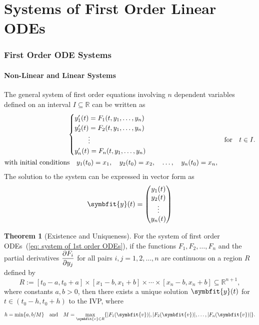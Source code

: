 \documentclass[10pt,UTF8]{article}
\renewcommand{\vec}[1]{%
  \ifnum0\ifcat#1a1\else0\fi>0
  \symbfit{#1}  %
  \else
  \symbf{#1}  %
  \fi
}
\newenvironment{theoremBox}
{ \bigskip
  \begin{tcolorbox}[colback=yellow!5!white,colframe=yellow!75!black,parbox=false,before
  upper=\par,before lower=\par]}
  {
\end{tcolorbox}}
\theoremstyle{definition}
\newtheorem{definition inner}{Definition}[section]
\theoremstyle{definition}
\newtheorem{theorem inner}{Theorem}[section]
\newenvironment{theorem}[1][]
{
  \begin{theoremBox}
  \begin{theorem inner}[#1]\hfill\par}
    {
    \end{theorem inner}
\end{theoremBox}}
\theoremstyle{definition}
\newtheorem*{proof inner}{\textit{Proof}}
\theoremstyle{plain}
\newtheorem{tip inner}{Tip}[section]
\theoremstyle{remark}
\begin{document}
\part*{Systems of First Order Linear ODEs}

\section{First Order ODE Systems}

\subsection{Non-Linear and Linear Systems}

The general system of first order equations involving
\(n\) dependent variables defined on an interval \(I \subseteq \mathbb{R}\)
can be written as
\begin{equation}
  \begin{gathered}
    \begin{cases}
      y_1'(t) = F_1(t, y_1, \ldots, y_n) \\
      y_2'(t) = F_2(t, y_1, \ldots, y_n) \\
      \qquad\vdots \\
      y_n'(t) = F_n(t, y_1, \ldots, y_n)
    \end{cases} \\
    \text{with initial conditions}\quad
    y_1(t_0) = x_1, \quad
    y_2(t_0) = x_2, \quad
    \ldots, \quad
    y_n(t_0) = x_n,
  \end{gathered}
  \qfor t\in I.
  \label{eq: system of 1st order ODEs}
\end{equation}
The solution to the system can be expressed in vector form as
\begin{equation*}
  \vec{y}(t) =
  \begin{pmatrix}
    y_1(t) \\
    y_2(t) \\
    \vdots \\
    y_n(t)
  \end{pmatrix}
\end{equation*}

\begin{theorem}[Existence and Uniqueness]
  {}\label{thm: Existence and Uniqueness for 1st order ODE Systems}
  For the system of first order ODEs~(\ref{eq: system of 1st order ODEs}),
  if the functions \(F_1, F_2, \ldots, F_n\) and the partial derivatives
  \(\displaystyle\pdv{F_i}{y_j}\) for all pairs \(i, j = 1, 2, \ldots, n\)
  are continuous on a region \(R\) defined by
  \begin{equation*}
    R := [t_0 - a, t_0 + a] \times [x_1 - b, x_1 + b] \times \cdots
    \times [x_n - b, x_n + b] \subseteq \mathbb{R}^{n+1},
  \end{equation*}
  where constants \(a, b > 0\), then there exists a unique solution
  \(\vec{y}(t)\) for \(t \in (t_0 - h, t_0 + h)\) to the IVP,
  where
  \begin{equation*}
    h = \min \{a, b/M\} \qand
    M = \max\limits_{\vec{v} \in R}\{
      \abs{F_1(\vec{v})}, \abs{F_2(\vec{v})}, \ldots, \abs{F_n(\vec{v})}
    \}.
  \end{equation*}
\end{theorem}
\end{document}

